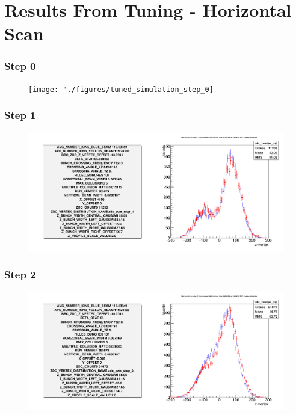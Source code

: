 \section{Results From Tuning - Horizontal Scan}

\begin{frame}
  \frametitle{Step 0}
  \begin{figure}
    \texttt{[image: "./figures/tuned\_simulation\_step\_0]}
    \label{fig:step_0}
  \end{figure}
\end{frame}

\begin{frame}
  \frametitle{Step 1}
  \begin{figure}
    \includegraphics[width=\linewidth]{"./figures/tuned_simulation_step_1"}
    \label{fig:step_1}
  \end{figure}
\end{frame}

\begin{frame}
  \frametitle{Step 2}
  \begin{figure}
    \includegraphics[width=\linewidth]{"./figures/tuned_simulation_step_2"}
    \label{fig:step_2}
  \end{figure}
\end{frame}

